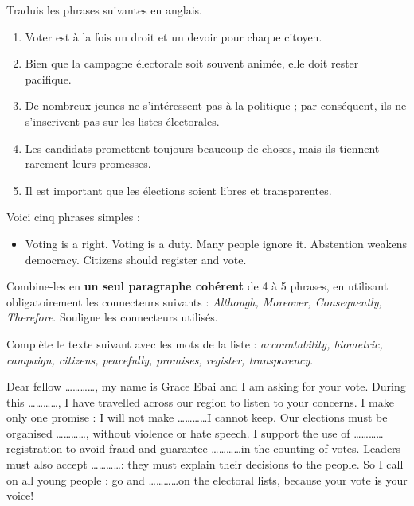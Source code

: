 \documentclass[11pt]{article}
\newcounter{popsec}
\newcounter{popsub}
\newcommand{\courssub}[1]{%
  \stepcounter{popsub}%
  \par\vspace{9pt}\noindent{\popxbold\fontsize{11.5}{13}\selectfont\color{popink}{\color{poporange}\thepopsec.\thepopsub}\hspace{6pt}#1}\par\nopagebreak\vspace{4pt}
}
\begin{document}
\courssub{Je m'entraîne}

\begin{exercice}[Traduction]
Traduis les phrases suivantes en anglais.
\begin{enumerate}
\item Voter est à la fois un droit et un devoir pour chaque citoyen.
\item Bien que la campagne électorale soit souvent animée, elle doit rester pacifique.
\item De nombreux jeunes ne s'intéressent pas à la politique ; par conséquent, ils ne s'inscrivent pas sur les listes électorales.
\item Les candidats promettent toujours beaucoup de choses, mais ils tiennent rarement leurs promesses.
\item Il est important que les élections soient libres et transparentes.
\end{enumerate}
\end{exercice}

\begin{exercice}
Voici cinq phrases simples :
\begin{itemize}
\item Voting is a right. Voting is a duty. Many people ignore it. Abstention weakens democracy. Citizens should register and vote.
\end{itemize}
Combine-les en \textbf{un seul paragraphe cohérent} de 4 à 5 phrases, en utilisant obligatoirement les connecteurs suivants : \emph{Although, Moreover, Consequently, Therefore}. Souligne les connecteurs utilisés.
\end{exercice}

\begin{exercice}
Complète le texte suivant avec les mots de la liste : \emph{accountability, biometric, campaign, citizens, peacefully, promises, register, transparency}.

\begin{textebox}
Dear fellow \ldots\ldots\ldots\ldots, my name is Grace Ebai and I am asking for your vote. During this \ldots\ldots\ldots\ldots, I have travelled across our region to listen to your concerns. I make only one promise : I will not make \ldots\ldots\ldots\ldots I cannot keep. Our elections must be organised \ldots\ldots\ldots\ldots, without violence or hate speech. I support the use of \ldots\ldots\ldots\ldots registration to avoid fraud and guarantee \ldots\ldots\ldots\ldots in the counting of votes. Leaders must also accept \ldots\ldots\ldots\ldots : they must explain their decisions to the people. So I call on all young people : go and \ldots\ldots\ldots\ldots on the electoral lists, because your vote is your voice!
\end{textebox}
\end{exercice}
\end{document}
